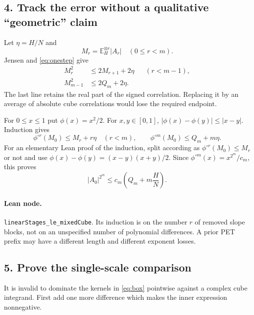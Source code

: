\documentclass[11pt]{article}
\newcommand{\E}{\mathbb E}
\newcommand{\idname}[1]{\nolinkurl{#1}}
\theoremstyle{definition}\newtheorem{definition}[lemma]{Definition}
\begin{document}
\subsection*{4. Track the error without a qualitative ``geometric'' claim}
Let $\eta=H/N$ and
\[
 M_r=\E_H^{\otimes r}|A_r|\quad(0\leq r<m).
\]
Jensen and \eqref{eq:onestep} give
\begin{align*}
 M_r^2&\leq2M_{r+1}+2\eta &&(r<m-1),\\
 M_{m-1}^2&\leq2Q_m+2\eta.&
\end{align*}
The last line retains the real part of the signed correlation. Replacing it by an average of absolute cube correlations would lose the required endpoint.

For $0\leq x\leq1$ put $\phi(x)=x^2/2$. For $x,y\in[0,1]$,
$|\phi(x)-\phi(y)|\leq|x-y|$. Induction gives
\[
 \phi^{\circ r}(M_0)\leq M_r+r\eta\quad(r<m),\qquad
 \phi^{\circ m}(M_0)\leq Q_m+m\eta.
\]
For an elementary Lean proof of the induction, split according as
$\phi^{\circ r}(M_0)\leq M_r$ or not and use
$\phi(x)-\phi(y)=(x-y)(x+y)/2$. Since
$\phi^{\circ m}(x)=x^{2^m}/c_m$, this proves
\begin{equation}\label{eq:boxbound}
 |A_0|^{2^m}\leq c_m\left(Q_m+m\frac HN\right).
\end{equation}

\paragraph{Lean node.}
\idname{linearStages_le_mixedCube}. Its induction is on the number $r$ of removed slope blocks, not on an unspecified number of polynomial differences. A prior PET prefix may have a different length and different exponent losses.

\subsection*{5. Prove the single-scale comparison}
It is invalid to dominate the kernels in \eqref{eq:box} pointwise against a complex cube integrand. First add one more difference which makes the inner expression nonnegative.
\end{document}
